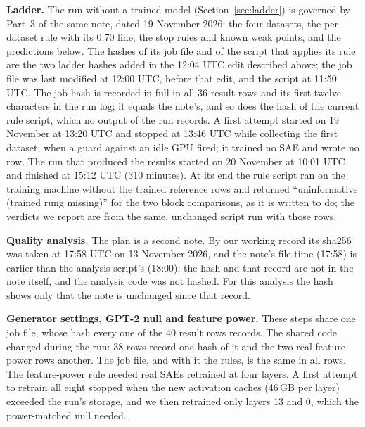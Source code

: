 \documentclass{article}
\begin{document}
\textbf{Ladder.} The run without a trained model (Section~\ref{sec:ladder}) is governed by Part~3 of the same note, dated 19 November 2026: the four datasets, the per-dataset rule with its 0.70 line, the stop rules and known weak points, and the predictions below. The hashes of its job file and of the script that applies its rule are the two ladder hashes added in the 12:04 UTC edit described above; the job file was last modified at 12:00 UTC, before that edit, and the script at 11:50 UTC. The job hash is recorded in full in all 36 result rows and its first twelve characters in the run log; it equals the note's, and so does the hash of the current rule script, which no output of the run records. A first attempt started on 19 November at 13:20 UTC and stopped at 13:46 UTC while collecting the first dataset, when a guard against an idle GPU fired; it trained no SAE and wrote no row. The run that produced the results started on 20 November at 10:01 UTC and finished at 15:12 UTC (310 minutes). At its end the rule script ran on the training machine without the trained reference rows and returned ``uninformative (trained rung missing)'' for the two block comparisons, as it is written to do; the verdicts we report are from the same, unchanged script run with those rows.

\textbf{Quality analysis.} The plan is a second note. By our working record its sha256 was taken at 17:58 UTC on 13 November 2026, and the note's file time (17:58) is earlier than the analysis script's (18:00); the hash and that record are not in the note itself, and the analysis code was not hashed. For this analysis the hash shows only that the note is unchanged since that record.

\textbf{Generator settings, GPT-2 null and feature power.} These steps share one job file, whose hash every one of the 40 result rows records. The shared code changed during the run: 38 rows record one hash of it and the two real feature-power rows another. The job file, and with it the rules, is the same in all rows. The feature-power rule needed real SAEs retrained at four layers. A first attempt to retrain all eight stopped when the new activation caches (46\,GB per layer) exceeded the run's storage, and we then retrained only layers 13 and 0, which the power-matched null needed.
\end{document}
